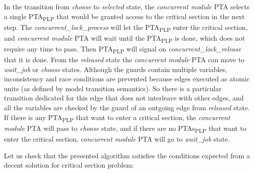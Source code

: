 \par In the transition from \textcolor{ColorUppaalState}{\textit{choose}} to \textcolor{ColorUppaalState}{\textit{selected}} state, the \textit{concurrent module} PTA selects a single PTA\textsubscript{PLP} that would be granted access to the critical section in the next step. The \textcolor{ColorUppaalChannel}{\textit{concurrent_lock_process}} will let the PTA\textsubscript{PLP} enter the critical section, and \textit{concurrent module} PTA will wait until the PTA\textsubscript{PLP} is done, which does not require any time to pass. Then PTA\textsubscript{PLP} will signal on \textcolor{ColorUppaalChannel}{\textit{concurrent_lock_release}} that it is done. From the \textcolor{ColorUppaalState}{\textit{released}} state the \textit{concurrent module} PTA can move to \textcolor{ColorUppaalState}{\textit{wait_job}} or \textcolor{ColorUppaalState}{\textit{choose}} states. Although the guards contain multiple variables, inconsistency and race conditions are prevented because edges executed as atomic units (as defined by model transition semantics). So there is a particular transition dedicated for this edge that does not interleave with other edges, and all the variables are checked by the guard of an outgoing edge from \textcolor{ColorUppaalState}{\textit{released}} state. If there is any PTA\textsubscript{PLP} that want to enter a critical section, the \textit{concurrent module} PTA will pass to \textcolor{ColorUppaalState}{\textit{choose}} state, and if there are no PTAs\textsubscript{PLP} that want to enter the critical section, \textit{concurrent module} PTA will go to \textcolor{ColorUppaalState}{\textit{wait_job}} state.
\par Let us check that the presented algorithm satisfies the conditions expected from a decent solution for critical section problem:
